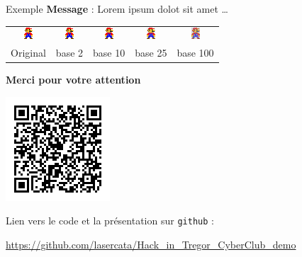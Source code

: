 \documentclass{beamer}
\begin{document}
    \begin{frame}{Exemple}%
        \textbf{Message} : Lorem ipsum dolot sit amet \ldots

        \begin{center}
            \begin{tabular}{ccccc}
                \includegraphics[scale=4.5]{pics/mario_0.png}
                &
                \includegraphics[scale=4.5]{pics/mario_lorem_2.png}
                &
                \includegraphics[scale=4.5]{pics/mario_lorem_10.png}
                &
                \includegraphics[scale=4.5]{pics/mario_lorem_25.png}
                &
                \includegraphics[scale=4.5]{pics/mario_lorem_100.png}
                \\
                Original
                & base 2
                & base 10
                & base 25
                & base 100
            \end{tabular}
        \end{center}
    \end{frame}%

    \begin{frame}%
        \begin{center}
            \large{\bf Merci pour votre attention}
        \end{center}

        \vspace{12pt}
        
        \begin{center}
            \includegraphics[scale=1]{pics/github_qrcode.png}

            Lien vers le code et la présentation sur \texttt{github} :

            \url{https://github.com/lasercata/Hack_in_Tregor_CyberClub_demo}
        \end{center}
    \end{frame}%
    
\end{document}
